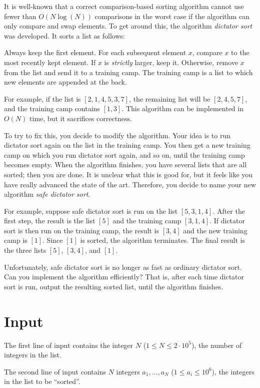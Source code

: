 
It is well-known that a correct comparison-based sorting algorithm cannot use fewer than $O(N\log(N))$ comparisons
in the worst case if the algorithm can only compare and swap elements.
To get around this, the algorithm \textit{dictator sort} was developed.
It sorts a list as follows:

Always keep the first element.
For each subsequent element $x$, compare $x$ to the most recently kept element.
If $x$ is \emph{strictly} larger, keep it.
Otherwise, remove $x$ from the list and send it to a training camp.
The training camp is a list to which new elements are appended at the back.

For example, if the list is $[2,1,4,5,3,7]$, the remaining list will be $[2,4,5,7]$,
and the training camp contains $[1,3]$.
This algorithm can be implemented in $O(N)$ time, but it sacrifices correctness.

To try to fix this, you decide to modify the algorithm.
Your idea is to run dictator sort again on the list in the training camp.
You then get a new training camp on which you run dictator sort again, and so on, until the training camp becomes empty.
When the algorithm finishes, you have several lists that are all sorted; then you are done.
It is unclear what this is good for, but it feels like you have really advanced the state of the art.
Therefore, you decide to name your new algorithm \textit{safe dictator sort}.

For example, suppose safe dictator sort is run on the list $[5,3,1,4]$.
After the first step, the result is the list $[5]$ and the training camp $[3,1,4]$.
If dictator sort is then run on the training camp, the result is $[3,4]$ and the new training camp is $[1]$.
Since $[1]$ is sorted, the algorithm terminates.
The final result is the three lists $[5]$, $[3,4]$, and $[1]$.

Unfortunately, safe dictator sort is no longer as fast as ordinary dictator sort.
Can you implement the algorithm efficiently?
That is, after each time dictator sort is run, output the resulting sorted list,
until the algorithm finishes.

\section*{Input}
The first line of input contains the integer $N$ ($1 \leq N \leq 2 \cdot 10^5$),
the number of integers in the list.

The second line of input contains $N$ integers $a_1, \dots, a_N$ ($1 \leq a_i \leq 10^6$),
the integers in the list to be ``sorted''.

